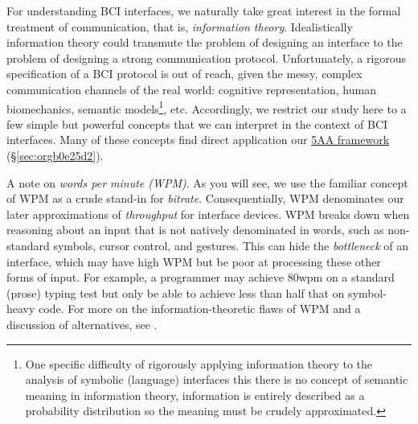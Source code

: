 \documentclass[logo,bsc,singlespacing,parskip]{infthesis}
\begin{document}
For understanding BCI interfaces, we naturally take great interest in the formal treatment of communication, that is, \emph{information theory}.
Idealistically information theory could transmute the problem of designing an interface to the problem of designing a strong communication protocol.
Unfortunately, a rigorous specification of a BCI protocol is out of reach, given the messy, complex communication channels of the real world: cognitive representation, human biomechanics, semantic models\footnote{One specific difficulty of rigorously applying information theory to the analysis of symbolic (language) interfaces this there is no concept of semantic meaning in information theory, information is entirely described as a probability distribution so the meaning must be crudely approximated.}, etc.
Accordingly, we restrict our study here to a few simple but powerful concepts that we can interpret in the context of BCI interfaces.
Many of these concepts find direct application our \hyperref[sec:orgb0e25d2]{5AA framework} (\S \ref{sec:orgb0e25d2}).

A note on \emph{words per minute (WPM)}.
As you will see, we use the familiar concept of WPM as a crude stand-in for \emph{bitrate}.
Consequentially, WPM denominates our later approximations of \emph{throughput} for interface devices.
WPM breaks down when reasoning about an input that is not natively denominated in words, such as non-standard symbols, cursor control, and gestures.
This can hide the \emph{bottleneck} of an interface, which may have high WPM but be poor at processing these other forms of input.
For example, a programmer may achieve 80wpm on a standard (prose) typing test but only be able to achieve less than half that on symbol-heavy code.
For more on the information-theoretic flaws of WPM and a discussion of alternatives, see \autocite[pp. 57]{liuInformationTheoryUnified}.
\end{document}
